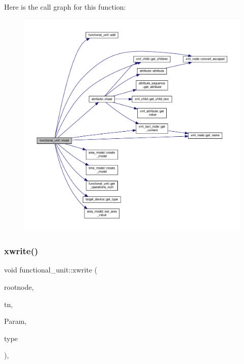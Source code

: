 Here is the call graph for this function\+:
\nopagebreak
\begin{figure}[H]
\begin{center}
\leavevmode
\includegraphics[width=350pt]{d8/dd6/structfunctional__unit_ae93d5279bbc04feec0a49a79734d9a28_cgraph}
\end{center}
\end{figure}
\mbox{\label{structfunctional__unit_a49837b741da6b92962511fc1d3d20ff0}} 
\subsubsection{\texorpdfstring{xwrite()}{xwrite()}}
{\footnotesize\ttfamily void functional\+\_\+unit\+::xwrite (\begin{DoxyParamCaption}\item[{\hyperlink{classxml__element}{xml\+\_\+element} $\ast$}]{rootnode,  }\item[{const \hyperlink{technology__node_8hpp_a33dd193b7bd6b987bf0d8a770a819fa7}{technology\+\_\+node\+Ref}}]{tn,  }\item[{const \hyperlink{Parameter_8hpp_a37841774a6fcb479b597fdf8955eb4ea}{Parameter\+Const\+Ref}}]{Param,  }\item[{const \hyperlink{target__device_8hpp_a476becc690220f0805ce73006449c732}{Target\+Device\+\_\+\+Type}}]{type }\end{DoxyParamCaption})\hspace{0.3cm}{\ttfamily [override]}, {\ttfamily [virtual]}}



